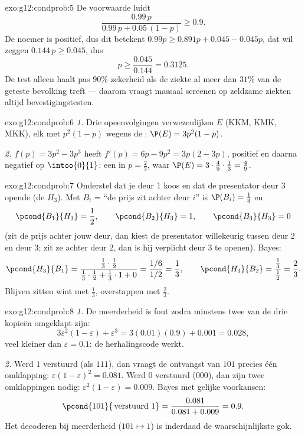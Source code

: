 \begin{solution}{exo:g12:condprob:5}
De voorwaarde luidt
\[
\frac{0.99\,p}{0.99\,p + 0.05\,(1-p)} \geq 0.9 .
\]
De noemer is positief, dus dit betekent
$0.99p \geq 0.891p + 0.045 - 0.045p$, dat wil zeggen
$0.144\,p \geq 0.045$, dus
\[
p \geq \frac{0.045}{0.144} = 0.3125 .
\]
De test alleen haalt pas $90\%$ zekerheid als de ziekte al meer dan $31\%$
van de geteste bevolking treft --- daarom vraagt massaal screenen op
zeldzame ziekten altijd bevestigingstesten.
\end{solution}

\begin{solution}{exo:g12:condprob:6}
\emph{1.} Drie opeenvolgingen verwezenlijken $E$ (KKM, KMK, MKK), elk met 
$p^2(1-p)$ wegens de : $\P(E) = 3p^2(1 - p)$.

\emph{2.} $f(p) = 3p^2 - 3p^3$ heeft $f'(p) = 6p - 9p^2 = 3p(2 - 3p)$,
positief en daarna negatief op $\intoo{0}{1}$: een  in $p = \frac23$,
waar $\P(E) = 3\cdot\frac49\cdot\frac13 = \frac49$.
\end{solution}

\begin{solution}{exo:g12:condprob:7}
Onderstel dat je deur 1 koos en dat de presentator deur 3 opende (de
 $H_3$). Met $B_i$ = ``de prijs zit achter deur $i$'' is
$\P(B_i) = \frac13$ en
\[
\pcond{B_1}{H_3} = \frac12, \qquad
\pcond{B_2}{H_3} = 1, \qquad
\pcond{B_3}{H_3} = 0
\]
(zit de prijs achter jouw deur, dan kiest de presentator willekeurig tussen
deur 2 en deur 3; zit ze achter deur 2, dan is hij verplicht deur 3 te
openen). Bayes:
\[
\pcond{H_3}{B_1}
= \frac{\frac13\cdot\frac12}{\frac13\cdot\frac12 + \frac13\cdot1 + 0}
= \frac{1/6}{1/2} = \frac13,
\qquad
\pcond{H_3}{B_2} = \frac{\frac13}{\frac12} = \frac23 .
\]
Blijven zitten wint met  $\frac13$, overstappen met  $\frac23$.
\end{solution}

\begin{solution}{exo:g12:condprob:8}
\emph{1.} De meerderheid is fout zodra minstens twee van de drie kopieën
omgeklapt zijn:
\[
3\varepsilon^2(1-\varepsilon) + \varepsilon^3
= 3(0.01)(0.9) + 0.001 = 0.028,
\]
veel kleiner dan $\varepsilon = 0.1$: de herhalingscode werkt.

\emph{2.} Werd $1$ verstuurd (als $111$), dan vraagt de ontvangst van $101$
precies één omklapping:  $\varepsilon(1-\varepsilon)^2 = 0.081$. Werd $0$
verstuurd ($000$), dan zijn twee omklappingen nodig:
$\varepsilon^2(1-\varepsilon) = 0.009$. Bayes met gelijke voorkansen:
\[
\pcond{101}{\,\text{verstuurd }1} = \frac{0.081}{0.081 + 0.009} = 0.9 .
\]
Het decoderen bij meerderheid ($101 \mapsto 1$) is inderdaad de
waarschijnlijkste gok.
\end{solution}

